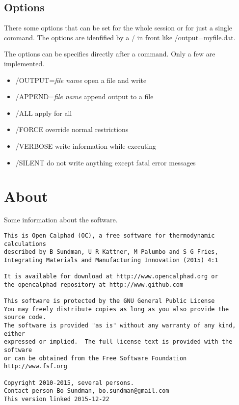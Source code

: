 \documentclass[12pt]{article}
\begin{document}
\subsection{Options}

There some options that can be set for the whole session or for just a
single command.  The options are idenfified by a / in front like
/output=myfile.dat.

The options can be specifies directly after a command.  Only a few are
implemented.

\begin{itemize}
\item /OUTPUT={\em file name} open a file and write
\item /APPEND={\em file name} append output to a file
\item /ALL apply for all
\item /FORCE override normal restrictions
\item /VERBOSE write information while executing
\item /SILENT do not write anything except fatal error messages
\end{itemize}
\section{About}

Some information about the software.

\begin{verbatim}
This is Open Calphad (OC), a free software for thermodynamic calculations
described by B Sundman, U R Kattner, M Palumbo and S G Fries,
Integrating Materials and Manufacturing Innovation (2015) 4:1

It is available for download at http://www.opencalphad.org or
the opencalphad repository at http://www.github.com

This software is protected by the GNU General Public License
You may freely distribute copies as long as you also provide the source code.
The software is provided "as is" without any warranty of any kind, either
expressed or implied.  The full license text is provided with the software
or can be obtained from the Free Software Foundation http://www.fsf.org

Copyright 2010-2015, several persons.
Contact person Bo Sundman, bo.sundman@gmail.com
This version linked 2015-12-22
\end{verbatim}
\end{document}
